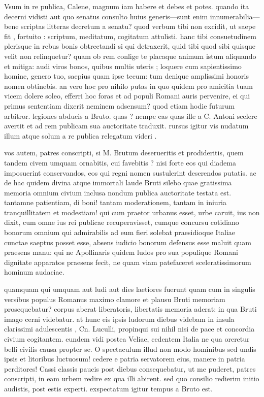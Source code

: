  Vsum in re publica, Calene, magnum iam habere et debes et potes. quando ita decerni vidisti aut quo senatus consulto huius generis—sunt enim innumerabilia—bene scriptas litteras decretum a senatu? quod verbum tibi non excidit, ut saepe fit , fortuito : scriptum, meditatum, cogitatum attulisti. hanc tibi consuetudinem plerisque in rebus bonis obtrectandi si qui detraxerit, quid tibi quod sibi quisque velit non relinquetur? quam ob rem conlige te placaque animum istum aliquando et mitiga: audi viros bonos, quibus multis uteris ; loquere cum sapientissimo homine, genero tuo, saepius quam ipse tecum: tum denique amplissimi honoris nomen obtinebis. an vero hoc pro nihilo putas in quo quidem pro amicitia tuam vicem dolere soleo, efferri hoc foras et ad populi Romani auris pervenire, ei qui primus sententiam dixerit neminem adsensum? quod etiam hodie futurum arbitror. legiones abducis a Bruto. quas ? nempe eas quas ille a C. Antoni scelere avertit et ad rem publicam sua auctoritate traduxit. rursus igitur vis nudatum illum atque solum a re publica relegatum videri .

 vos autem, patres conscripti, si M. Brutum deserueritis et prodideritis, quem tandem civem umquam ornabitis, cui favebitis ? nisi forte eos qui diadema imposuerint conservandos, eos qui regni nomen sustulerint deserendos putatis. ac de hac quidem divina atque immortali laude Bruti silebo quae gratissima memoria omnium civium inclusa nondum publica auctoritate testata est. tantamne patientiam, di boni! tantam moderationem, tantam in iniuria tranquillitatem et modestiam! qui cum praetor urbanus esset, urbe caruit, ius non dixit, cum omne ius rei publicae recuperavisset, cumque concursu cotidiano bonorum omnium qui admirabilis ad eum fieri solebat praesidioque Italiae cunctae saeptus posset esse, absens iudicio bonorum defensus esse maluit quam praesens manu: qui ne Apollinaris quidem ludos pro sua populique Romani dignitate apparatos praesens fecit, ne quam viam patefaceret sceleratissimorum hominum audaciae.

 quamquam qui umquam aut ludi aut dies laetiores fuerunt quam cum in singulis versibus populus Romanus maximo clamore et plausu Bruti memoriam prosequebatur? corpus aberat liberatoris, libertatis memoria aderat: in qua Bruti imago cerni videbatur. at hunc eis ipsis ludorum diebus videbam in insula clarissimi adulescentis , Cn. Luculli, propinqui sui nihil nisi de pace et concordia civium cogitantem. eundem vidi postea Veliae, cedentem Italia ne qua oreretur belli civilis causa propter se. O spectaculum illud non modo hominibus sed undis ipsis et litoribus luctuosum! cedere e patria servatorem eius, manere in patria perditores! Cassi classis paucis post diebus consequebatur, ut me puderet, patres conscripti, in eam urbem redire ex qua illi abirent. sed quo consilio redierim initio audistis, post estis experti. exspectatum igitur tempus a Bruto est.

